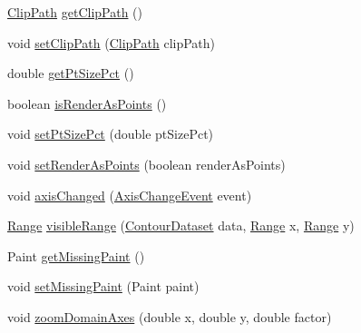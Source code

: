 \begin{DoxyCompactItemize}
\item 
\mbox{\hyperlink{classorg_1_1jfree_1_1chart_1_1_clip_path}{Clip\+Path}} \mbox{\hyperlink{classorg_1_1jfree_1_1chart_1_1plot_1_1_contour_plot_a3ecdad29b185dbe26d3ee9309ed391a4}{get\+Clip\+Path}} ()
\item 
void \mbox{\hyperlink{classorg_1_1jfree_1_1chart_1_1plot_1_1_contour_plot_a6ce14f242532e0c07b00197a49d04d94}{set\+Clip\+Path}} (\mbox{\hyperlink{classorg_1_1jfree_1_1chart_1_1_clip_path}{Clip\+Path}} clip\+Path)
\item 
double \mbox{\hyperlink{classorg_1_1jfree_1_1chart_1_1plot_1_1_contour_plot_a97a8768596d5ba1fb2c4e3da782b2485}{get\+Pt\+Size\+Pct}} ()
\item 
boolean \mbox{\hyperlink{classorg_1_1jfree_1_1chart_1_1plot_1_1_contour_plot_a3e14f26fc315d69e403fee5981707bde}{is\+Render\+As\+Points}} ()
\item 
void \mbox{\hyperlink{classorg_1_1jfree_1_1chart_1_1plot_1_1_contour_plot_a8c8a55126fc3c3a8958e5c10e11dc042}{set\+Pt\+Size\+Pct}} (double pt\+Size\+Pct)
\item 
void \mbox{\hyperlink{classorg_1_1jfree_1_1chart_1_1plot_1_1_contour_plot_abef714fa820d1eb741694ae585e08e7f}{set\+Render\+As\+Points}} (boolean render\+As\+Points)
\item 
void \mbox{\hyperlink{classorg_1_1jfree_1_1chart_1_1plot_1_1_contour_plot_a59029d9c4f1fa0ecbd4d201ab0f01189}{axis\+Changed}} (\mbox{\hyperlink{classorg_1_1jfree_1_1chart_1_1event_1_1_axis_change_event}{Axis\+Change\+Event}} event)
\item 
\mbox{\hyperlink{classorg_1_1jfree_1_1data_1_1_range}{Range}} \mbox{\hyperlink{classorg_1_1jfree_1_1chart_1_1plot_1_1_contour_plot_aff13263089fd27354654832a635c99ee}{visible\+Range}} (\mbox{\hyperlink{interfaceorg_1_1jfree_1_1data_1_1contour_1_1_contour_dataset}{Contour\+Dataset}} data, \mbox{\hyperlink{classorg_1_1jfree_1_1data_1_1_range}{Range}} x, \mbox{\hyperlink{classorg_1_1jfree_1_1data_1_1_range}{Range}} y)
\item 
Paint \mbox{\hyperlink{classorg_1_1jfree_1_1chart_1_1plot_1_1_contour_plot_a134ec8320f51dd9bfee1f9ea63059d18}{get\+Missing\+Paint}} ()
\item 
void \mbox{\hyperlink{classorg_1_1jfree_1_1chart_1_1plot_1_1_contour_plot_a7965decd5f2983c5bcfa66cda1d83849}{set\+Missing\+Paint}} (Paint paint)
\item 
void \mbox{\hyperlink{classorg_1_1jfree_1_1chart_1_1plot_1_1_contour_plot_a9e61903b6c3ce275c20315ac0cc47951}{zoom\+Domain\+Axes}} (double x, double y, double factor)

\end{DoxyCompactItemize}
